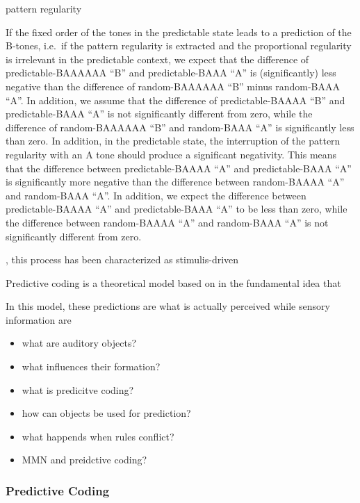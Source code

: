 \documentclass[stu,a4paper,11pt,floatsintext]{apa7}
\providecommand{\tightlist}{%
  \setlength{\itemsep}{0pt}\setlength{\parskip}{0pt}}
\begin{document}
pattern regularity

If the fixed order of the tones in the predictable state leads to a
prediction of the B-tones, i.e.~if the pattern regularity is extracted
and the proportional regularity is irrelevant in the predictable
context, we expect that the difference of predictable-BAAAAAA
\enquote{B} and predictable-BAAA \enquote{A} is (significantly) less
negative than the difference of random-BAAAAAA \enquote{B} minus
random-BAAA \enquote{A}. In addition, we assume that the difference of
predictable-BAAAA \enquote{B} and predictable-BAAA \enquote{A} is not
significantly different from zero, while the difference of
random-BAAAAAA \enquote{B} and random-BAAA \enquote{A} is significantly
less than zero. In addition, in the predictable state, the interruption
of the pattern regularity with an A tone should produce a significant
negativity. This means that the difference between predictable-BAAAA
\enquote{A} and predictable-BAAA \enquote{A} is significantly more
negative than the difference between random-BAAAA \enquote{A} and
random-BAAA \enquote{A}. In addition, we expect the difference between
predictable-BAAAA \enquote{A} and predictable-BAAA \enquote{A} to be
less than zero, while the difference between random-BAAAA \enquote{A}
and random-BAAA \enquote{A} is not significantly different from zero.

, this process has been characterized as stimulis-driven

Predictive coding is a theoretical model based on in the fundamental
idea that

In this model, these predictions are what is actually perceived while
sensory information are

\begin{itemize}
\tightlist
\item
  what are auditory objects?
\item
  what influences their formation?
\item
  what is predicitve coding?
\item
  how can objects be used for prediction?
\item
  what happends when rules conflict?
\item
  MMN and preidctive coding?
\end{itemize}

\hypertarget{predictive-coding}{%
\subsubsection{Predictive Coding}\label{predictive-coding}}
\end{document}
